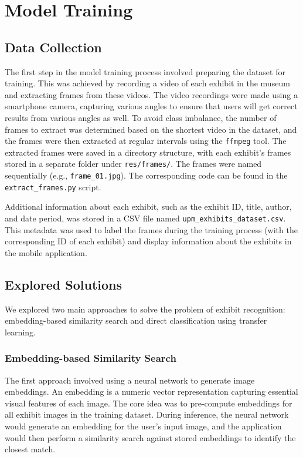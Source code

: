 \chapter{Model Training}

\section{Data Collection}

The first step in the model training process involved preparing the dataset for training. This was achieved by recording a video of each exhibit in the museum and extracting frames from these videos. The video recordings were made using a smartphone camera, capturing various angles to ensure that users will get correct results from various angles as well. To avoid class imbalance, the number of frames to extract was determined based on the shortest video in the dataset, and the frames were then extracted at regular intervals using the \texttt{ffmpeg} tool. The extracted frames were saved in a directory structure, with each exhibit's frames stored in a separate folder under \texttt{res/frames/}. The frames were named sequentially (e.g., \texttt{frame\_01.jpg}). The corresponding code can be found in the \texttt{extract\_frames.py} script.

Additional information about each exhibit, such as the exhibit ID, title, author, and date period, was stored in a CSV file named \texttt{upm\_exhibits\_dataset.csv}. This metadata was used to label the frames during the training process (with the corresponding ID of each exhibit) and display information about the exhibits in the mobile application.

\section{Explored Solutions}

We explored two main approaches to solve the problem of exhibit recognition: embedding-based similarity search and direct classification using transfer learning.

\subsection{Embedding-based Similarity Search}

The first approach involved using a neural network to generate image embeddings. An embedding is a numeric vector representation capturing essential visual features of each image. The core idea was to pre-compute embeddings for all exhibit images in the training dataset. During inference, the neural network would generate an embedding for the user's input image, and the application would then perform a similarity search against stored embeddings to identify the closest match.

